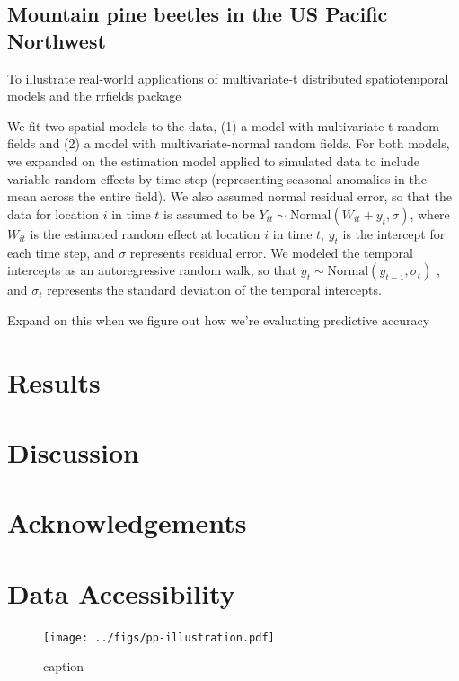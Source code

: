 \documentclass[12pt,english]{article}
\begin{document}
\begin{spacing}{1.05}
\subsection{Mountain pine beetles in the US Pacific Northwest}

To illustrate real-world applications of multivariate-t distributed
spatiotemporal models and the rrfields package

We fit two spatial models to the data, (1) a model with
multivariate-t random fields and (2) a model with multivariate-normal random
fields. For both models, we expanded on the estimation model applied to
simulated data to include variable random effects by time step (representing
seasonal anomalies in the mean across the entire field). We also assumed normal
residual error, so that the data for location $i$ in time $t$ is
assumed to be 
$Y_{it}\sim \mathrm{Normal}\left(W_{it}+y_t, \sigma \right)$, 
where $W_{it}$ is the estimated random effect
at location $i$ in time $t$, $y_t$ is the intercept for each time
step, and $\sigma$ represents residual error. 
We modeled the temporal intercepts as an autoregressive random walk, 
so that 
$y_t\sim \mathrm{Normal}\left( y_{t-1},\sigma_t \right)$ , and
$\sigma_t$ represents the standard deviation of the temporal intercepts.

Expand on this when we figure out how we're evaluating predictive accuracy

\section{Results}

\section{Discussion}

\section{Acknowledgements}

\section{Data Accessibility}


\begin{figure}[htb]
\begin{center}
  \texttt{[image: ../figs/pp-illustration.pdf]}
\caption{caption}
\label{fig:didactic}
\end{center}
\end{figure}


\end{spacing}
\end{document}

